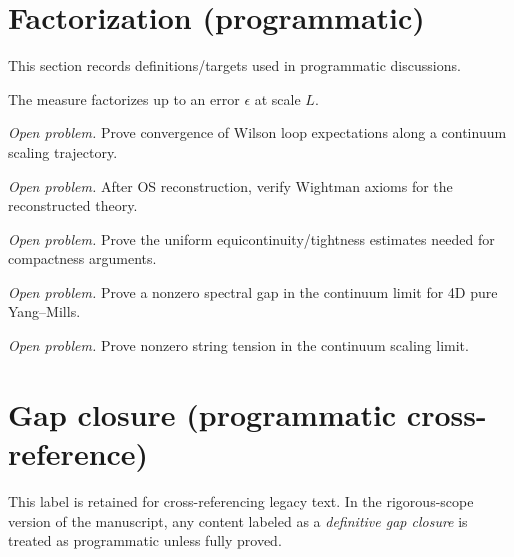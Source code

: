 \section{Factorization (programmatic)}
\label{sec:factorization}
This section records definitions/targets used in programmatic discussions.

\begin{definition}
\label{def:eps-fact}
The measure factorizes up to an error $\epsilon$ at scale $L$.
\end{definition}

\begin{theorem}
\label{thm:wilson-convergence}
\emph{Open problem.} Prove convergence of Wilson loop expectations along a continuum scaling trajectory.
\end{theorem}

\begin{theorem}
\label{thm:wightman}
\emph{Open problem.} After OS reconstruction, verify Wightman axioms for the reconstructed theory.
\end{theorem}

\begin{theorem}
\label{thm:equicontinuity}
\emph{Open problem.} Prove the uniform equicontinuity/tightness estimates needed for compactness arguments.
\end{theorem}

\begin{theorem}
\label{thm:pure-spectral-gap}
\emph{Open problem.} Prove a nonzero spectral gap in the continuum limit for 4D pure Yang--Mills.
\end{theorem}

\begin{theorem}
\label{thm:sigma-positive-continuum}
\emph{Open problem.} Prove nonzero string tension in the continuum scaling limit.
\end{theorem}


\section{Gap closure (programmatic cross-reference)}
\label{app:definitive-gap-closure}
This label is retained for cross-referencing legacy text.
In the rigorous-scope version of the manuscript, any content labeled as a \emph{definitive gap closure} is treated as programmatic unless fully proved.

